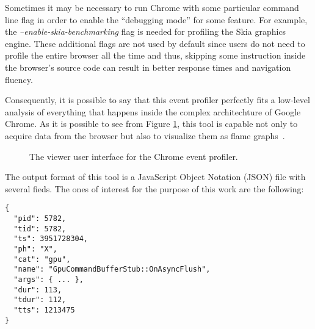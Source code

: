 Sometimes it may be necessary
to run Chrome with some particular command line flag in order to enable the
``debugging mode'' for some feature. For example, the \emph{--enable-skia-benchmarking}
flag is needed for profiling the Skia graphics engine. These additional flags
are not used by default since users do not need to profile the entire browser
all the time and thus, skipping some instruction inside the browser's source code
can result in better response times and navigation fluency.

Consequently, it is possible
to say that this event profiler perfectly fits a low-level analysis of everything
that happens inside the complex architechture of Google Chrome.
As it is possible to see from Figure \ref{img:chrome_event_profiler}, this tool
is capable not only to acquire data from the browser but also to visualize them
as flame graphs~\cite{gregg2016flame}.
\begin{figure}[!htb]
    \caption{The viewer user interface for the Chrome event profiler.}
    \label{img:chrome_event_profiler}
\end{figure}

The output format of this tool is a JavaScript Object Notation (JSON) file with
several fieds. The ones of interest for the purpose of this work are the following:
\begin{lstlisting}
{
  "pid": 5782,
  "tid": 5782,
  "ts": 3951728304,
  "ph": "X",
  "cat": "gpu",
  "name": "GpuCommandBufferStub::OnAsyncFlush",
  "args": { ... },
  "dur": 113,
  "tdur": 112,
  "tts": 1213475
}
\end{lstlisting}

